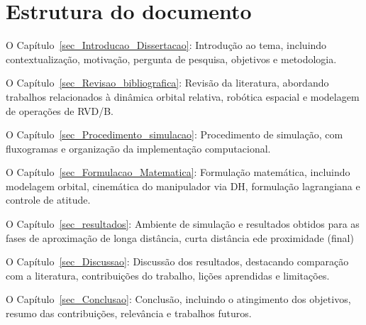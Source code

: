 \section{Estrutura do documento}

O Capítulo~\ref{sec_Introducao_Dissertacao}: Introdução ao tema, incluindo contextualização, motivação, pergunta de pesquisa, objetivos e metodologia.

O Capítulo~\ref{sec_Revisao_bibliografica}: Revisão da literatura, abordando trabalhos relacionados à dinâmica orbital relativa, robótica espacial e modelagem de operações de RVD/B.

O Capítulo~\ref{sec_Procedimento_simulacao}: Procedimento de simulação, com fluxogramas e organização da implementação computacional.

O Capítulo~\ref{sec_Formulacao_Matematica}: Formulação matemática, incluindo modelagem orbital, cinemática do manipulador via DH, formulação lagrangiana e controle de atitude.

O Capítulo~\ref{sec_resultados}: Ambiente de simulação e resultados obtidos para as fases de aproximação de longa distância, curta distância ede proximidade (final)

O Capítulo~\ref{sec_Discussao}: Discussão dos resultados, destacando comparação com a literatura, contribuições do trabalho, lições aprendidas e limitações.

O Capítulo~\ref{sec_Conclusao}: Conclusão, incluindo o atingimento dos objetivos, resumo das contribuições, relevância e trabalhos futuros.